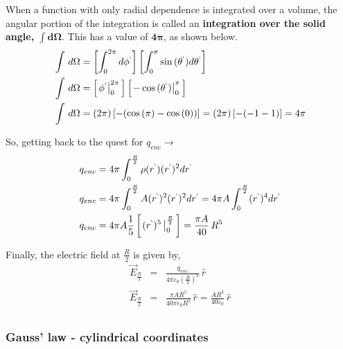 \documentclass[12pt]{article}
\begin{document}
\begin{flushleft}
When a function with only radial dependence is integrated over a volume, the angular portion of the integration is called an {\bf \color{myblue} integration over the solid angle, $\mathbf{\int d\Omega}$}.  This has a value of {\bf \color{myblue} $\mathbf{4\pi}$}, as shown below.
\begin{equation*}
\begin{aligned}
& \int \, d\Omega = \left[ \int^{2\pi}_{0} d\phi^{`} \right] \left[ \int^{\pi}_{0}   \sin{(\theta^{`})}d\theta^{`} \right] \\
& \int \, d\Omega = \left[ \left. \phi^{`} \right\vert_{0}^{2\pi} \, \right] \left[ \left. -\cos{(\theta^{`})} \right\vert_{0}^{\pi} \, \right] \\
& \int \, d\Omega = \left( 2\pi \right) \left[ -( \cos{(\pi)}- \cos{(0)}) \right] = \left( 2\pi \right) \left[ -( -1- 1) \right] = 4\pi\\
\end{aligned}
\end{equation*}

So, getting back to the quest for $q_{enc} \rightarrow $ 
\begin{equation*}
\begin{aligned}
& q_{enc} = 4\pi \int^{\frac{R}{2}}_{0} \rho(r^{`})  (r^{`})^{2}dr^{`}  \\
& q_{enc} = 4\pi  \int^{\frac{R}{2}}_{0} A(r^{`})^{2} (r^{`})^{2}dr^{`}= 4\pi A \int^{\frac{R}{2}}_{0} (r^{`})^{4}dr^{`} \\
& q_{enc}  = 4\pi A \frac{1}{5} \left[ \left. (r^{`})^{5} \, \right\vert_{0}^{\frac{R}{2}} \, \right]  = \frac{\pi A}{40} \, R^{5} 
\end{aligned}
\end{equation*}

Finally, the electric field at $\frac{R}{2}$ is given by,
\begin{eqnarray*}
 \vec{E}_{\frac{R}{2}}  & = & \frac{ q_{enc} }{ 4 \pi \varepsilon_{0} \left( \frac{R}{2} \right)^{2}} \, \hat{r}  \\
 \vec{E}_{\frac{R}{2}}  & = & \frac{ \pi A R^{5} }{ 40 \pi \varepsilon_{0} R^{2}} \, \hat{r}  = \frac{ AR^{3} }{ 40 \varepsilon_{0} } \, \hat{r}\\
\end{eqnarray*}

\subsubsection*{\bf Gauss' law - cylindrical coordinates}


\end{flushleft}
\end{document}
